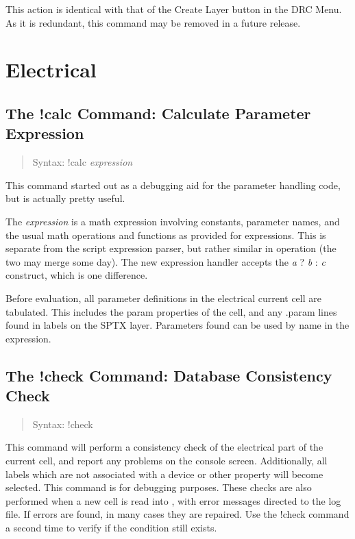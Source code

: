 This action is identical with that of the {\cb Create Layer} button in
the {\cb DRC Menu}.  As it is redundant, this command may be removed
in a future release.


\section{Electrical}

\subsection{The {\cb !calc} Command: Calculate Parameter Expression}
\begin{quote}
Syntax: {\vt !calc} {\it expression}
\end{quote}
This command started out as a debugging aid for the parameter
handling code, but is actually pretty useful.

The {\it expression} is a math expression involving constants,
parameter names, and the usual math operations and functions as
provided for {\WRspice} expressions.  This is separate from the
script expression parser, but rather similar in operation (the two
may merge some day).  The new expression handler accepts the {\it a}
?  {\it b} :  {\it c} construct, which is one difference.
  
Before evaluation, all parameter definitions in the electrical
current cell are tabulated.  This includes the {\et param} properties
of the cell, and any {\vt .param} lines found in labels on the SPTX
layer.  Parameters found can be used by name in the expression.

\subsection{The {\cb !check} Command: Database Consistency Check}
\begin{quote}
Syntax: {\vt !check}
\end{quote}
This command will perform a consistency check of the electrical part
of the current cell, and report any problems on the console screen. 
Additionally, all labels which are not associated with a device or
other property will become selected.  This command is for debugging
purposes.  These checks are also performed when a new cell is read
into {\Xic}, with error messages directed to the log file.  If errors
are found, in many cases they are repaired.  Use the {\cb !check}
command a second time to verify if the condition still exists.

